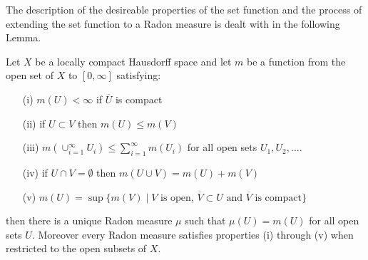 The description of the desireable properties of the set function and
the process of extending the set function to a Radon measure is dealt with in the following Lemma.
\begin{lem}\label{ExtensionToRadonMeasure}Let $X$ be a locally compact Hausdorff space and let $m$ be
  a function from the open set of $X$ to $[0,\infty]$ satisfying:
\begin{itemize}
\item[(i)]$m(U) < \infty$ if $\overline{U}$ is compact
\item[(ii)]if $U \subset V$ then $m(U) \leq m(V)$
\item[(iii)]$m(\cup_{i=1}^\infty U_i) \leq \sum_{i=1}^\infty m(U_i)$
  for all open sets $U_1, U_2, \dotsc$.
\item[(iv)]if $U \cap V = \emptyset$ then $m(U \cup V) = m(U) + m(V)$
\item[(v)]$m(U) = \sup \lbrace m(V) \mid V \text{ is open, } \overline{V} \subset U \text{ and }
  \overline{V} \text{ is compact} \rbrace$
\end{itemize}
then there is a unique Radon measure $\mu$ such that $\mu(U) = m(U)$
for all open sets $U$.  Moreover every Radon measure satisfies
properties (i) through (v) when restricted to the open subsets of $X$.
\end{lem}
